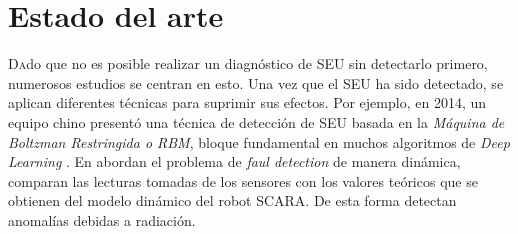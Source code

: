 \chapter{Estado del arte}
\label{ch:EstadoDelArte}

\lettrine[lraise=-0.1, lines=2, loversize=0.2]{D}{a}do que no es posible realizar
un diagnóstico de \gls{SEU} sin detectarlo primero, numerosos estudios se centran
en esto. Una vez que el \gls{SEU} ha sido detectado, se aplican diferentes
técnicas para suprimir sus efectos. Por ejemplo, en 2014, un equipo chino presentó
una técnica de detección de \gls{SEU} basada en la \textit{Máquina de Boltzman
Restringida o \gls{RBM}}, bloque fundamental en muchos algoritmos de \textit{Deep
Learning} \cite{RBMSEUdetection}. En \cite{SCARA} abordan el problema de
\textit{faul detection} de manera dinámica, comparan las lecturas tomadas de los
sensores con los valores teóricos que se obtienen del modelo dinámico del robot
SCARA. De esta forma detectan anomalías debidas a radiación.




\cite{AFLS}






\endinput
